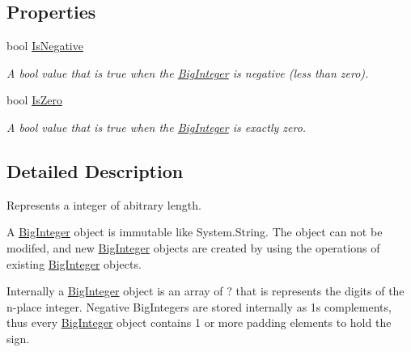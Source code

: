 \subsection*{Properties}
\begin{DoxyCompactItemize}
\item 
bool \hyperlink{class_scott_garland_1_1_big_integer_a3bed3f2524ecfac198f5d93cfccad0b0}{Is\+Negative}
\begin{DoxyCompactList}\small\item\em A bool value that is true when the \hyperlink{class_scott_garland_1_1_big_integer}{Big\+Integer} is negative (less than zero). \end{DoxyCompactList}\item 
bool \hyperlink{class_scott_garland_1_1_big_integer_ad925705201ff656dc819599e78a19ccd}{Is\+Zero}
\begin{DoxyCompactList}\small\item\em A bool value that is true when the \hyperlink{class_scott_garland_1_1_big_integer}{Big\+Integer} is exactly zero. \end{DoxyCompactList}\end{DoxyCompactItemize}


\subsection{Detailed Description}
Represents a integer of abitrary length. 

A \hyperlink{class_scott_garland_1_1_big_integer}{Big\+Integer} object is immutable like System.\+String. The object can not be modifed, and new \hyperlink{class_scott_garland_1_1_big_integer}{Big\+Integer} objects are created by using the operations of existing \hyperlink{class_scott_garland_1_1_big_integer}{Big\+Integer} objects. 

Internally a \hyperlink{class_scott_garland_1_1_big_integer}{Big\+Integer} object is an array of ? that is represents the digits of the n-\/place integer. Negative Big\+Integers are stored internally as 1\textquotesingle{}s complements, thus every \hyperlink{class_scott_garland_1_1_big_integer}{Big\+Integer} object contains 1 or more padding elements to hold the sign. 


